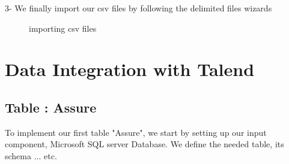 3- We finally import our csv files by following the delimited files wizards

\begin{figure}[H]
\centering
{}
\caption{importing csv files}
\label{fig:psqlConec}
\end{figure}
\clearpage
\section{Data Integration with Talend}
    \subsection{Table : Assure}
To implement our first table "Assure", we start by setting up our input component, Microsoft SQL server Database. We define the needed table, its schema ... etc.
\begin{figure}[H]
\centering
{}
\end{figure}
\vskip0.2cm
        

